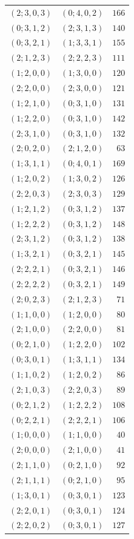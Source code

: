 \begin{longtable}{@{}rrr@{}}
$(2;3,0,3)$ & $(0;4,0,2)$ & $166$\\
$(0;3,1,2)$ & $(2;3,1,3)$ & $140$\\
$(0;3,2,1)$ & $(1;3,3,1)$ & $155$\\
$(2;1,2,3)$ & $(2;2,2,3)$ & $111$\\
$(1;2,0,0)$ & $(1;3,0,0)$ & $120$\\
$(2;2,0,0)$ & $(2;3,0,0)$ & $121$\\
$(1;2,1,0)$ & $(0;3,1,0)$ & $131$\\
$(1;2,2,0)$ & $(0;3,1,0)$ & $142$\\
$(2;3,1,0)$ & $(0;3,1,0)$ & $132$\\
$(2;0,2,0)$ & $(2;1,2,0)$ & $63$\\
$(1;3,1,1)$ & $(0;4,0,1)$ & $169$\\
$(1;2,0,2)$ & $(1;3,0,2)$ & $126$\\
$(2;2,0,3)$ & $(2;3,0,3)$ & $129$\\
$(1;2,1,2)$ & $(0;3,1,2)$ & $137$\\
$(1;2,2,2)$ & $(0;3,1,2)$ & $148$\\
$(2;3,1,2)$ & $(0;3,1,2)$ & $138$\\
$(1;3,2,1)$ & $(0;3,2,1)$ & $145$\\
$(2;2,2,1)$ & $(0;3,2,1)$ & $146$\\
$(2;2,2,2)$ & $(0;3,2,1)$ & $149$\\
$(2;0,2,3)$ & $(2;1,2,3)$ & $71$\\
$(1;1,0,0)$ & $(1;2,0,0)$ & $80$\\
$(2;1,0,0)$ & $(2;2,0,0)$ & $81$\\
$(0;2,1,0)$ & $(1;2,2,0)$ & $102$\\
$(0;3,0,1)$ & $(1;3,1,1)$ & $134$\\
$(1;1,0,2)$ & $(1;2,0,2)$ & $86$\\
$(2;1,0,3)$ & $(2;2,0,3)$ & $89$\\
$(0;2,1,2)$ & $(1;2,2,2)$ & $108$\\
$(0;2,2,1)$ & $(2;2,2,1)$ & $106$\\
$(1;0,0,0)$ & $(1;1,0,0)$ & $40$\\
$(2;0,0,0)$ & $(2;1,0,0)$ & $41$\\
$(2;1,1,0)$ & $(0;2,1,0)$ & $92$\\
$(2;1,1,1)$ & $(0;2,1,0)$ & $95$\\
$(1;3,0,1)$ & $(0;3,0,1)$ & $123$\\
$(2;2,0,1)$ & $(0;3,0,1)$ & $124$\\
$(2;2,0,2)$ & $(0;3,0,1)$ & $127$\\

\end{longtable}
